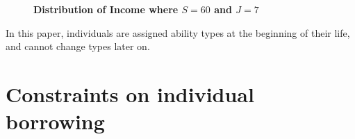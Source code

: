 \documentclass[letterpaper,12pt]{article}
\theoremstyle{definition}
\begin{document}
    \begin{figure}[htb]\centering \captionsetup{width=4.0in}
      \caption{\label{FigIncome}\textbf{Distribution of Income where $S=60$ and $J=7$}}
    \end{figure}

  In this paper, individuals are assigned ability types at the beginning of their life, and cannot change types later on.


\newpage
\section{Constraints on individual borrowing}\label{AppBorConstr}

  \setcounter{equation}{0}
\end{document}
